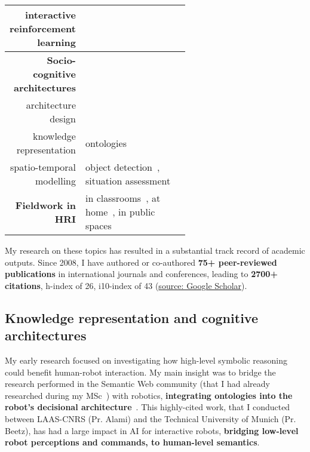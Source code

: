 \begin{table}[h!]
\begin{tabular}{rp{0.6\linewidth}}
        interactive reinforcement learning & \small
        \cite{senft2017leveraging,senft2017supervised, senft2019teaching,  winkle2020insitu} \\
        \midrule
        \textbf{Socio-cognitive architectures} \\
        architecture design & \small \cite{lemaignan2017artificial, baxter2016cognitive,lemaignan2014challenges,lallee2012towards, mallet2010genom3} \\
        knowledge representation & \small
        ontologies~\cite{lemaignan2010oro, lemaignan2013explicit} \\
        spatio-temporal modelling & \small object
        detection~\cite{wallbridge2017qualitative}, situation
        assessment\cite{lemaignan2018underworlds,sallami2019simulation} \\
        \midrule
        \textbf{Fieldwork in HRI} & \small in
        classrooms~\cite{hood2015when, lemaignan2016learning, jacq2016building,
        baxter2015wider,kennedy2016cautious,senft2018robots}, at
        home~\cite{mondada2015ranger}, in public spaces~\cite{winkle2020insitu}\\
        \bottomrule
    \end{tabular}
    \label{pi-expertise}
\end{table}


My research on these topics has resulted in a substantial track record of
academic outputs.  Since 2008, I have authored or co-authored \textbf{75+
peer-reviewed publications} in international journals and conferences, leading
to \textbf{2700+ citations}, h-index of 26, i10-index of 43
(\href{https://scholar.google.co.uk/citations?user=-CUOP2gAAAAJ}{source: Google
Scholar}).

\subsection{Knowledge representation and cognitive architectures}

My early research focused on investigating how high-level symbolic reasoning
could benefit human-robot interaction. My main insight was to bridge the
research performed in the Semantic Web community (that I had already researched
during my MSc~\cite{lemaignan2006mason}) with robotics, \textbf{integrating
ontologies into the robot's decisional
architecture}~\autocite[presented below]{lemaignan2010oro}. This highly-cited work, that I
conducted between LAAS-CNRS (Pr. Alami) and the Technical University of
Munich (Pr. Beetz), has had a large impact in AI for interactive robots,
\textbf{bridging low-level robot perceptions and commands, to human-level
semantics}.

